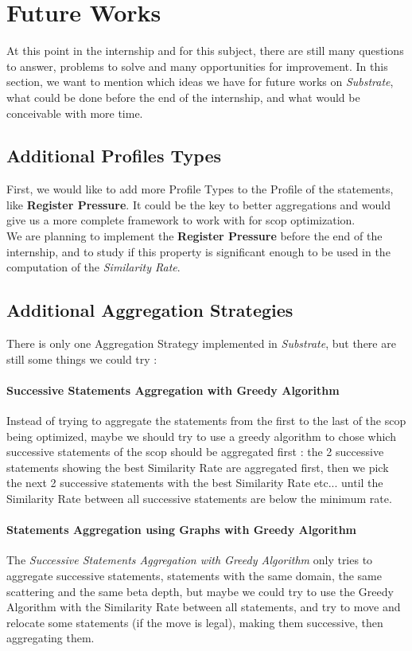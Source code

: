 \documentclass[paper=a4, fontsize=11.5pt]{scrartcl}
\numberwithin{equation}{section}        %
\numberwithin{figure}{section}          %
\numberwithin{table}{section}               %
\begin{document}
\section{Future Works}
\label{sec:future_works}
At this point in the internship and for this subject, there are still many
questions to answer, problems to solve and many opportunities for improvement.
In this section, we want to mention which ideas we have for future works on \textit{Substrate},
what could be done before the end of the internship, and what would be conceivable with more time.
    \subsection{Additional Profiles Types}
        First, we would like to add more Profile Types to the Profile of the statements,
        like \textbf{Register Pressure}. It could be the key to better aggregations and would
        give us a more complete framework to work with for scop optimization.\\

        We are planning to implement the \textbf{Register Pressure} before the end of the
        internship, and to study if this property is significant enough to be used in the
        computation of the \textit{Similarity Rate}.
    \subsection{Additional Aggregation Strategies}
        There is only one Aggregation Strategy implemented in \textit{Substrate}, but
        there are still some things we could try :
        \paragraph*{Successive Statements Aggregation with Greedy Algorithm}
            Instead of trying to aggregate the statements from the first to the last
            of the scop being optimized, maybe we should try to use a greedy algorithm
            to chose which successive statements of the scop should be aggregated first :
            the 2 successive statements showing the best Similarity Rate are aggregated
            first, then we pick the next 2 successive statements with the best Similarity Rate etc...
            until the Similarity Rate between all successive statements are below the minimum rate.\\
        \paragraph*{Statements Aggregation using Graphs with Greedy Algorithm}
            The \textit{Successive Statements Aggregation with Greedy Algorithm} only
            tries to aggregate successive statements, statements with the same domain,
            the same scattering and the same beta depth, but maybe we could try to
            use the Greedy Algorithm with the Similarity Rate between all statements,
            and try to move and relocate some statements (if the move is legal),
            making them successive, then aggregating them.
\end{document}
